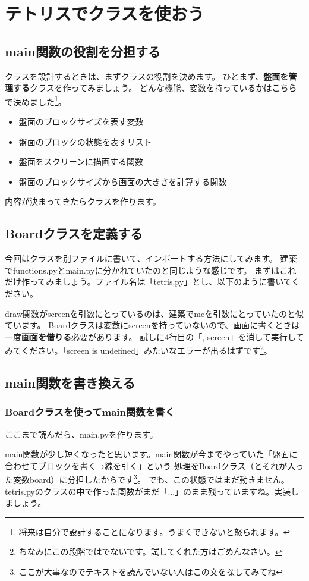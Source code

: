 \chapter{テトリスでクラスを使おう}
\section{main関数の役割を分担する}
クラスを設計するときは、まずクラスの役割を決めます。
ひとまず、\textbf{盤面を管理する}クラスを作ってみましょう。
どんな機能、変数を持っているかはこちらで決めました\footnote{将来は自分で設計することになります。うまくできないと怒られます。}。
\begin{itemize}
  \item 盤面のブロックサイズを表す変数
  \item 盤面のブロックの状態を表すリスト
  \item 盤面をスクリーンに描画する関数
  \item 盤面のブロックサイズから画面の大きさを計算する関数
\end{itemize}
内容が決まってきたらクラスを作ります。
\section{Boardクラスを定義する}
今回はクラスを別ファイルに書いて、インポートする方法にしてみます。
建築でfunctions.pyとmain.pyに分かれていたのと同じような感じです。
まずはこれだけ作ってみましょう。ファイル名は「tetris.py」とし、以下のように書いてください。

draw関数がscreenを引数にとっているのは、建築でmcを引数にとっていたのと似ています。
Boardクラスは変数にscreenを持っていないので、画面に書くときは一度\textbf{画面を借りる}必要があります。
試しに4行目の「, screen」を消して実行してみてください。「screen is undefined」みたいなエラーが出るはずです\footnote{ちなみにこの段階ではでないです。試してくれた方はごめんなさい。}。
\section{main関数を書き換える}
\subsection{Boardクラスを使ってmain関数を書く}
ここまで読んだら、main.pyを作ります。

main関数が少し短くなったと思います。main関数が今までやっていた「盤面に合わせてブロックを書く→線を引く」という
処理をBoardクラス（とそれが入った変数board）に分担したからです\footnote{ここが大事なのでテキストを読んでいない人はこの文を探してみてね}。
でも、この状態ではまだ動きません。tetris.pyのクラスの中で作った関数がまだ「...」のまま残っていますね。実装しましょう。
